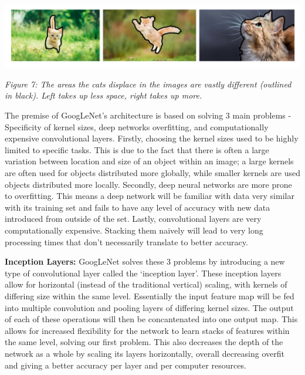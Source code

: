 \documentclass[11pt]{article}
\def\paraskip{\vskip 0.4cm}
\begin{document}
        \begin{center}
            \includegraphics[width=15cm]{images/cats.png}
            \\
            \raggedright \textit{
            Figure 7: The areas the cats displace in the images are vastly different (outlined in black). Left takes up less space, right takes up more.
            }
        \end{center}

        The premise of GoogLeNet's architecture is based on solving 3 main problems - Specificity of kernel sizes, deep networks overfitting, and computationally expensive convolutional layers. Firstly, choosing the kernel sizes used to be highly limited to specific tasks. This is due to the fact that there is often a large variation between location and size of an object within an image; a large kernels are often used for objects distributed more globally, while smaller kernels are used objects distributed more locally. Secondly, deep neural networks are more prone to overfitting. This means a deep network will be familiar with data very similar with its training set and fails to have any level of accuracy with new data introduced from outside of the set. Lastly, convolutional layers are very computationally expensive. Stacking them naively will lead to very long processing times that don't necessarily translate to better accuracy.

        \paraskip

        \noindent\textbf{Inception Layers: } GoogLeNet solves these 3 problems by introducing a new type of convolutional layer called the `inception layer'. These inception layers allow for horizontal (instead of the traditional vertical) scaling, with kernels of differing size within the same level. Essentially the input feature map will be fed into multiple convolution and pooling layers of differing kernel sizes. The output of each of these operations will then be concantenated into one output map. This allows for increased flexibility for the network to learn stacks of features within the same level, solving our first problem. This also decreases the depth of the network as a whole by scaling its layers horizontally, overall decreasing overfit and giving a better accuracy per layer and per computer resources.
\end{document}
